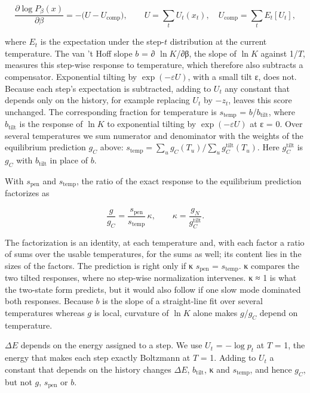 \documentclass[aps,prx,onecolumn,superscriptaddress,longbibliography]{revtex4-2}
\begin{document}
\begin{equation}\frac{\partial \log P_\beta(x)}{\partial\beta}=-\big(U-U_{\mathrm{comp}}\big),\qquad U=\sum_t U_t(x_t),\quad U_{\mathrm{comp}}=\sum_t E_t[U_t],\end{equation}

where \(E_{t}\) is the expectation under the step-\(t\) distribution at the current temperature. The van 't Hoff slope \(b\) = ∂ \(\ln K\)/∂β, the slope of \(\ln K\) against 1/\(T\), measures this step-wise response to temperature, which therefore also subtracts a compensator. Exponential tilting by \(\exp(-\varepsilon U)\), with a small tilt ε, does not. Because each step's expectation is subtracted, adding to \(U_{t}\) any constant that depends only on the history, for example replacing \(U_t\) by \(-z_t\), leaves this score unchanged. The corresponding fraction for temperature is \(s_{\mathrm{temp}}\) = \(b\)/\(b_{\mathrm{tilt}}\), where \(b_{\mathrm{tilt}}\) is the response of \(\ln K\) to exponential tilting by \(\exp(-\varepsilon U)\) at ε = 0. Over several temperatures we sum numerator and denominator with the weights of the equilibrium prediction \(g_{C}\) above: \(s_{\mathrm{temp}}=\sum_u g_C(T_u)/\sum_u g_C^{\mathrm{tilt}}(T_u)\). Here \(g_{C}^{\mathrm{tilt}}\) is \(g_{C}\) with \(b_{\mathrm{tilt}}\) in place of \(b\).

With \(s_{\mathrm{pen}}\) and \(s_{\mathrm{temp}}\), the ratio of the exact response to the equilibrium prediction factorizes as

\begin{equation}\frac{g}{g_C}=\frac{s_{\mathrm{pen}}}{s_{\mathrm{temp}}}\,\kappa,\qquad \kappa=\frac{g_N}{g_C^{\mathrm{tilt}}}.\end{equation}

The factorization is an identity, at each temperature and, with each factor a ratio of sums over the usable temperatures, for the sums as well; its content lies in the sizes of the factors. The prediction is right only if κ \(s_{\mathrm{pen}}\) = \(s_{\mathrm{temp}}\). κ compares the two tilted responses, where no step-wise normalization intervenes. κ ≈ 1 is what the two-state form predicts, but it would also follow if one slow mode dominated both responses. Because \(b\) is the slope of a straight-line fit over several temperatures whereas \(g\) is local, curvature of \(\ln K\) alone makes \(g\)/\(g_{C}\) depend on temperature.

\(\Delta E\) depends on the energy assigned to a step. We use \(U_{t}\) = \(-\log p_t\) at \(T\) = 1, the energy that makes each step exactly Boltzmann at \(T\) = 1. Adding to \(U_{t}\) a constant that depends on the history changes \(\Delta E\), \(b_{\mathrm{tilt}}\), κ and \(s_{\mathrm{temp}}\), and hence \(g_{C}\), but not \(g\), \(s_{\mathrm{pen}}\) or \(b\).
\end{document}
